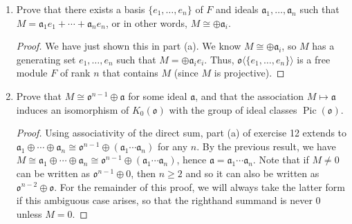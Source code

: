 \documentclass[10pt]{article}
\renewcommand{\a}{\mathfrak{a}}
\renewcommand{\o}{\mathfrak{o}}
\newcommand{\gen}[1]{\langle #1 \rangle}
\DeclareMathOperator*{\im}{Im}
\let\ker\relax
\DeclareMathOperator*{\ker}{Ker}
\DeclareMathOperator*{\Pic}{Pic}
\begin{document}
\begin{enumerate}
\begin{enumerate}
\begin{proof}
We will now induct on $n$ (the least possible size of a generating set for $M$) to show that if $M \subseteq \o^{n}$ then $M = \a_1 \oplus \cdots \oplus \a_n$ for some nonzero ideals $\a_i$ of $\o$.  This is clear if $n=0$, since then $M \cong (0)$ is the empty sum.  If $n=1$, then $M$ is, by definition, a nonzero ideal of $\o$.  Supposing this holds for $n-1$, if $M \subseteq \o^n$ we can take the projection map $\pi$ of $\o^n$ onto its first coordinate, and consider its restriction to $M$.  The image of $M$ is a submodule of the image of $\o^n$, which is $\o$.  Therefore, the image of $M$ is an ideal $\a_n$, which is also projective.  The kernel lies within the last $n-1$ summands of $\o^n$, hence by induction equals $\a_1 \oplus \cdots \oplus \a_{n-1}$.  Since $\a_n$ is projective, the exact sequence
$$
\begin{tikzcd}
0 \arrow[r] & \ker \pi \mid_M \arrow[r] & M \arrow[r] & \im M \arrow[r] & 0
\end{tikzcd}
$$
which is the same as
$$
\begin{tikzcd}
0 \arrow[r] & \a_1 \oplus \cdots \oplus \a_{n-1}  \arrow[r] & M \arrow[r] & \a_n \arrow[r] & 0
\end{tikzcd}
$$
splits, giving us $M = \a_1 \oplus \cdots \oplus\a_n$.  We have already argued that each $\a_i$ contains a rank $1$ submodule $M_i$.  Therefore, $F' = M_1 \oplus \cdots \oplus M_n$ is a free module of rank $n$ contained in $M$.

\end{proof}

\item Prove that there exists a basis $\{e_1, \dots , e_n\}$ of $F$ and ideals $\a_1, \dots , \a_n$ such that $M = \a_1 e_1 + \cdots + \a_ne_n$, or in other words, $M \cong \oplus \a_i$.

\begin{proof}
We have just shown this in part (a).  We know $M \cong \oplus \a_i$, so $M$ has a generating set $e_1, \dots , e_n$ such that $M = \oplus \a_i e_i$.  Thus, $\o\gen{\{e_1, \dots , e_n\}}$ is a free module $F$ of rank $n$ that contains $M$ (since $M$ is projective).
\end{proof}

\item Prove that $M \cong  \o^{n-1} \oplus \a$ for some ideal $\a$, and that the association $M \mapsto \a$ induces an isomorphism of $K_0(\o)$ with the group of ideal classes $\Pic(\o)$.

\begin{proof}
Using associativity of the direct sum, part (a) of exercise 12 extends to $\a_1 \oplus \cdots \oplus \a_n \cong \o^{n-1} \oplus (\a_1 \cdots \a_n)$ for any $n$.  By the previous result, we have $M \cong \a_1 \oplus \cdots \oplus \a_n \cong \o^{n-1} \oplus (\a_1 \cdots \a_n)$, hence $\a = \a_1 \cdots \a_n$.  Note that if $M \neq 0$ can be written as $\o^{n-1} \oplus 0$, then $n \geq 2$ and so it can also be written as $\o^{n-2} \oplus \o$.  For the remainder of this proof, we will always take the latter form if this ambiguous case arises, so that the righthand summand is never $0$ unless $M = 0$.


\end{proof}
\end{enumerate}
\end{enumerate}
\end{document}
